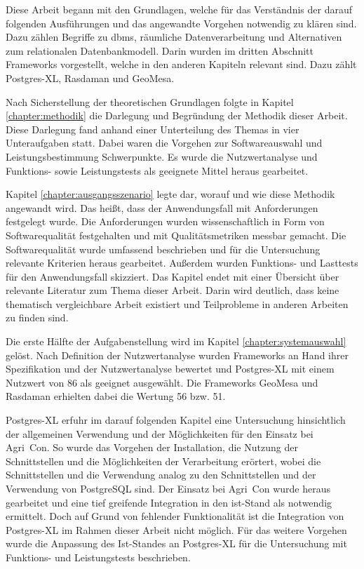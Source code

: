 Diese Arbeit begann mit den Grundlagen, welche für das Verständnis der darauf folgenden Ausführungen und das angewandte Vorgehen notwendig zu klären sind.
Dazu zählen Begriffe zu \Gls{dbms}, räumliche Datenverarbeitung und Alternativen zum relationalen Datenbankmodell.
Darin wurden im dritten Abschnitt Frameworks vorgestellt, welche in den anderen Kapiteln relevant sind.
Dazu zählt Postgres-XL, Rasdaman und GeoMesa.

Nach Sicherstellung der theoretischen Grundlagen folgte in Kapitel \ref{chapter:methodik} die Darlegung und Begründung der Methodik dieser Arbeit.
Diese Darlegung fand anhand einer Unterteilung des Themas in vier Unteraufgaben statt.
Dabei waren die Vorgehen zur Softwareauswahl und Leistungsbestimmung Schwerpunkte.
Es wurde die Nutzwertanalyse und Funktions- sowie Leistungstests als geeignete Mittel heraus gearbeitet.

Kapitel \ref{chapter:ausgangsszenario} legte dar, worauf und wie diese Methodik angewandt wird.
Das heißt, dass der Anwendungsfall mit Anforderungen festgelegt wurde.
Die Anforderungen wurden wissenschaftlich in Form von Softwarequalität festgehalten und mit Qualitätsmetriken messbar gemacht.
Die Softwarequalität wurde umfassend beschrieben und für die Untersuchung relevante Kriterien heraus gearbeitet.
Außerdem wurden Funktions- und Lasttests für den Anwendungsfall skizziert.
Das Kapitel endet mit einer Übersicht über relevante Literatur zum Thema dieser Arbeit.
Darin wird deutlich, dass keine thematisch vergleichbare Arbeit existiert und Teilprobleme in anderen Arbeiten zu finden sind.

Die erste Hälfte der Aufgabenstellung wird im Kapitel \ref{chapter:systemauswahl} gelöst.
Nach Definition der Nutzwertanalyse wurden Frameworks an Hand ihrer Spezifikation und der Nutzwertanalyse bewertet und Postgres-XL mit einem Nutzwert von 86 als geeignet ausgewählt.
Die Frameworks GeoMesa und Rasdaman erhielten dabei die Wertung 56 bzw. 51.

Postgres-XL erfuhr im darauf folgenden Kapitel eine Untersuchung hinsichtlich der allgemeinen Verwendung und der Möglichkeiten für den Einsatz bei Agri~Con.
So wurde das Vorgehen der Installation, die Nutzung der Schnittstellen und die Möglichkeiten der Verarbeitung erörtert, wobei die Schnittstellen und die Verwendung analog zu den Schnittstellen und der Verwendung von PostgreSQL sind.
Der Einsatz bei Agri~Con wurde heraus gearbeitet und eine tief greifende Integration in den ist-Stand als notwendig ermittelt.
Doch auf Grund von fehlender Funktionalität ist die Integration von Postgres-XL im Rahmen dieser Arbeit nicht möglich.
Für das weitere Vorgehen wurde die Anpassung des Ist-Standes an Postgres-XL für die Untersuchung mit Funktions- und Leistungstests beschrieben.

